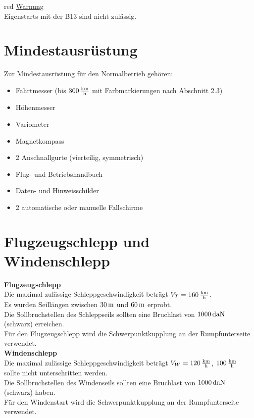 \begin{color}{red}
\large{\underline{Warnung}}\\
Eigenstarts mit der B13 sind nicht zulässig.
\end{color}
\newpage
\section{Mindestausrüstung}
Zur Mindestausrüstung für den Normalbetrieb gehören:\\
\begin{itemize}
\item Fahrtmesser (bis $\unit[300]{\frac{km}{h}}$ mit Farbmarkierungen nach Abschnitt 2.3)
\item Höhenmesser
\item Variometer
\item Magnetkompass
\item 2 Anschnallgurte (vierteilig, symmetrisch)
\item Flug- und Betriebshandbuch
\item Daten- und Hinweisschilder
\item 2 automatische oder manuelle Fallschirme
\end{itemize}

\section{Flugzeugschlepp und Windenschlepp}

\textbf{Flugzeugschlepp}\\
Die maximal zulässige Schleppgeschwindigkeit beträgt $V_T=\unit[160]{\frac{km}{h}}$.\\
Es wurden Seillängen zwischen $\unit[30]{m}$ und $\unit[60]{m}$ erprobt.\\
Die Sollbruchstellen des Schleppseils sollten eine Bruchlast von $\unit[1000]{daN}$ (schwarz) erreichen.\\
Für den Flugzeugschlepp wird die Schwerpunktkupplung an der Rumpfunterseite verwendet.\\

\textbf{Windenschlepp}\\
Die maximal zulässige Schleppgeschwindigkeit beträgt $V_W=\unit[120]{\frac{km}{h}}$, $\unit[100]{\frac{km}{h}}$ sollte nicht unterschritten werden.\\
Die Sollbruchstellen des Windenseils sollten eine Bruchlast von $\unit[1000]{daN}$ (schwarz) haben.\\
Für den Windenstart wird die Schwerpunktkupplung an der Rumpfunterseite verwendet.
\newpage

